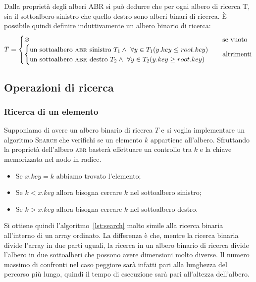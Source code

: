 Dalla proprietà degli alberi \textsc{ABR} si può dedurre che per ogni albero di ricerca T, sia il sottoalbero sinistro che quello destro sono alberi binari di ricerca. È possibile quindi definire induttivamente un albero binario di ricerca:
\begin{displaymath}
T=
\begin{cases}
\varnothing & \mbox{se vuoto}\\
\begin{cases}
  \text{un sottoalbero \textsc{abr} sinistro }T_{1} \land \ \forall y \in T_{1}(y.key \leq root.key)  \\
  \text{un sottoalbero \textsc{abr} destro }T_{2} \land \ \forall y \in T_{2} (y.key \geq root.key)
\end{cases}
& \mbox{altrimenti}
\end{cases}
\end{displaymath}

\subsection{Operazioni di ricerca}

\subsubsection{Ricerca di un elemento}
Supponiamo di avere un albero binario di ricerca $T$ e si voglia implementare un algoritmo \textsc{Search} che verifichi se un elemento $k$ appartiene all'albero. Sfruttando la proprietà dell'albero \textsc{abr} basterà effettuare un controllo tra $k$ e la chiave memorizzata nel nodo in radice.
\begin{itemize}
\item Se $x.key=k$ abbiamo trovato l'elemento;
\item Se $k < x.key$ allora bisogna cercare
$k$ nel sottoalbero sinistro;
\item Se $k > x.key$ allora bisogna cercare $k$ nel sottoalbero destro.
\end{itemize}
Si ottiene quindi l'algoritmo~\ref{lst:search} molto simile alla ricerca binaria all'interno di un array ordinato. La differenza è che, mentre la ricerca binaria divide l'array in due parti uguali, la ricerca in un albero binario di ricerca divide l'albero in due sottoalberi che possono avere dimensioni molto diverse. Il numero massimo di confronti nel caso peggiore sarà infatti pari alla lunghezza del percorso più lungo, quindi il tempo di esecuzione sarà pari all'altezza dell'albero.

